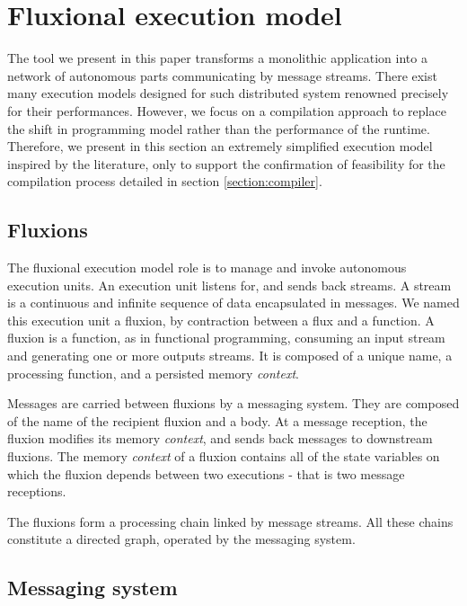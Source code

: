 \section{Fluxional execution model} \label{section:model}

The tool we present in this paper transforms a monolithic application into a network of autonomous parts communicating by message streams.
There exist many execution models designed for such distributed system renowned precisely for their performances\cite{Welsh2000, Jain2006, Wu2007, Zaharia2010, Akidau2013, Marz2011}.
However, we focus on a compilation approach to replace the shift in programming model rather than the performance of the runtime.
Therefore, we present in this section an extremely simplified execution model inspired by the literature, only to support the confirmation of feasibility for the compilation process detailed in section \ref{section:compiler}.

\subsection{Fluxions}

The fluxional execution model role is to manage and invoke autonomous execution units.
An execution unit listens for, and sends back streams.
A stream is a continuous and infinite sequence of data encapsulated in messages.
We named this execution unit a fluxion, by contraction between a flux and a function.
A fluxion is a function, as in functional programming, consuming an input stream and generating one or more outputs streams.
It is composed of a unique name, a processing function, and a persisted memory \textit{context}.

Messages are carried between fluxions by a messaging system.
They are composed of the name of the recipient fluxion and a body.
At a message reception, the fluxion modifies its memory \textit{context}, and sends back messages to downstream fluxions.
The memory \textit{context} of a fluxion contains all of the state variables on which the fluxion depends between two executions - that is two message receptions.

The fluxions form a processing chain linked by message streams.
All these chains constitute a directed graph, operated by the messaging system.

\subsection{Messaging system}

